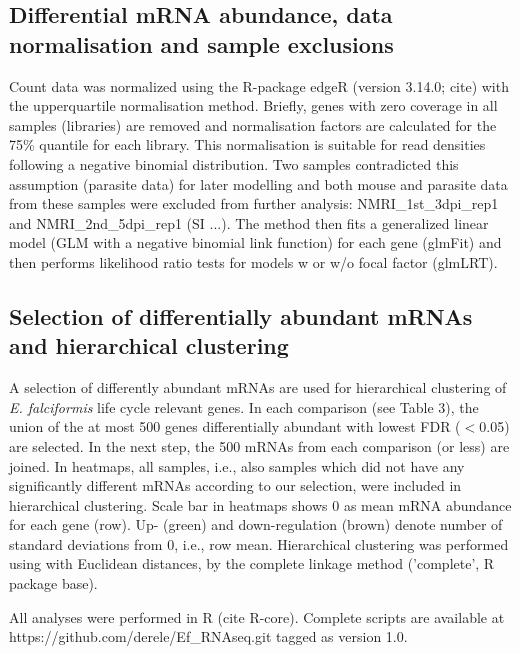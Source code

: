 \documentclass{bmcart}
\begin{document}
\subsection*{Differential mRNA abundance, data normalisation and sample exclusions}
Count data was normalized using the R-package edgeR (version 3.14.0;
cite) with the upperquartile normalisation method. Briefly, genes with
zero coverage in all samples (libraries) are removed and normalisation
factors are calculated for the 75\% quantile for each library. This
normalisation is suitable for read densities following a negative
binomial distribution. Two samples contradicted this assumption
(parasite data) for later modelling and both mouse and parasite data
from these samples were excluded from further analysis:
NMRI\_1st\_3dpi\_rep1 and NMRI\_2nd\_5dpi\_rep1 (SI ...). The method
then fits a generalized linear model (GLM with a negative binomial
link function) for each gene (glmFit) and then performs likelihood
ratio tests for models w or w/o focal factor (glmLRT).

\subsection*{Selection of differentially abundant mRNAs and hierarchical clustering}
A selection of differently abundant mRNAs are used for hierarchical
clustering of \textit{E. falciformis} life cycle relevant genes. In
each comparison (see Table 3), the union of the at most 500 genes
differentially abundant with lowest FDR ($<$0.05) are selected. In the
next step, the 500 mRNAs from each comparison (or less) are
joined. In heatmaps, all samples, i.e., also samples which did not have any
significantly different mRNAs according to our selection, were
included in hierarchical clustering. Scale bar in heatmaps shows 0 as
mean mRNA abundance for each gene (row). Up- (green) and
down-regulation (brown) denote number of standard deviations from 0,
i.e., row mean. Hierarchical clustering was performed using with
Euclidean distances, by the complete linkage method ('complete', R package
base).

All analyses were performed in R (cite R-core). Complete scripts are
available at https://github.com/derele/Ef\_RNAseq.git tagged as version
1.0.



\end{document}
